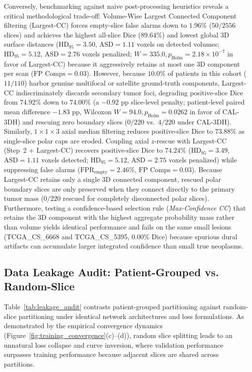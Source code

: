 \documentclass[11pt,a4paper]{article}
\begin{document}
Conversely, benchmarking against naive post-processing heuristics reveals a critical methodological trade-off: Volume-Wise Largest Connected Component filtering (Largest-CC) forces empty-slice false alarms down to $1.96\%$ ($50 / 2556$ slices) and achieves the highest all-slice Dice ($89.64\%$) and lowest global 3D surface distances ($\text{HD}_{95} = 3.50$, $\text{ASD} = 1.11$ voxels on detected volumes; $\text{HD}_{95} = 5.12$, $\text{ASD} = 2.76$ voxels penalized; $W = 335.0, p_{\text{Holm}} = 2.18 \times 10^{-7}$ in favor of Largest-CC) because it aggressively retains at most one 3D component per scan ($\text{FP Comps} = 0.03$). However, because $10.0\%$ of patients in this cohort ($11 / 110$) harbor genuine multifocal or satellite ground-truth components, Largest-CC indiscriminately discards secondary tumor foci, degrading positive-slice Dice from $74.92\%$ down to $74.00\%$ (a $-0.92\text{ pp}$ slice-level penalty; patient-level paired mean difference $-1.83\text{ pp}$, Wilcoxon $W = 94.0, p_{\text{Holm}} = 0.0262$ in favor of CAL-3DH) and rescuing zero boundary slices ($0 / 220$ vs.\ $4 / 220$ under CAL-3DH). Similarly, $1 \times 1 \times 3$ axial median filtering reduces positive-slice Dice to $73.88\%$ as single-slice polar caps are eroded. Coupling axial $z$-rescue with Largest-CC (Step~2 + Largest-CC) recovers positive-slice Dice to $74.24\%$ ($\text{HD}_{95} = 3.49$, $\text{ASD} = 1.11$ voxels detected; $\text{HD}_{95} = 5.12$, $\text{ASD} = 2.75$ voxels penalized) while suppressing false alarms ($\text{FPR}_{\text{empty}} = 2.46\%$, $\text{FP Comps} = 0.03$). Because Largest-CC retains only a single 3D connected component, rescued polar boundary slices are only preserved when they connect directly to the primary tumor mass ($0 / 220$ rescued for completely disconnected polar slices). Furthermore, testing a confidence-based selection rule (\textit{Max-Confidence CC}) that retains the 3D component with the highest aggregate probability mass rather than volume yields identical performance and fails on the same small lesions (TCGA\_CS\_6668 and TCGA\_CS\_5395, $0.00\%$ Dice) because spurious dural artifacts can accumulate larger integrated confidence than small true neoplasms.

\subsection{Data Leakage Audit: Patient-Grouped vs. Random-Slice}
\label{sec:leakage_audit}
Table~\ref{tab:leakage_audit} contrasts patient-grouped partitioning against random-slice partitioning under identical network architectures and loss formulations. As demonstrated by the empirical convergence dynamics (Figure~\ref{fig:training_convergence}(c)--(d)), random slice splitting leads to an unnatural loss collapse and curve inversion, where validation performance surpasses training performance because adjacent slices are shared across partitions.
\end{document}
